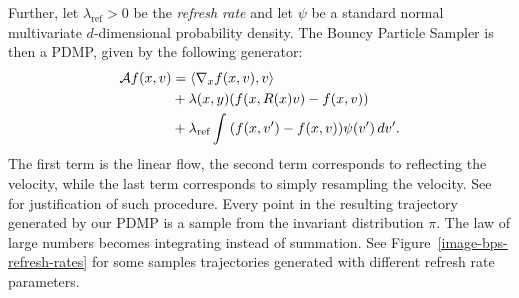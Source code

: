 \documentclass[report.tex]{subfiles}
\begin{document}
Further, let $\lambda_{\text{ref}} > 0$ be the \textit{refresh rate} and let
$\psi$ be a standard normal multivariate $d$-dimensional probability density.
The Bouncy Particle Sampler is then a PDMP, given by the following generator:
\begin{align*}
  \mathcal{A}f(x, v) &= \langle \nabla_{x} f(x, v), v\rangle \\
                     &+ \lambda(x, y)(f(x, R(x)v) - f(x, v)) \\
                     &+ \lambda_{\text{ref}} \int_{{}}^{{}} {(f(x, v') - f(x, v))\psi(v')}\, d{v'}.
\end{align*}
The first term is the linear flow, the second term corresponds to reflecting the velocity,
while the last term corresponds to simply resampling the velocity.
See \cite{peters2012rejection, bouchard2015bouncy} for justification of such procedure.
Every point in the resulting trajectory generated by our PDMP is a sample from
the invariant distribution $\pi$.
The law of large numbers becomes integrating instead of summation.
See Figure~\ref{image-bps-refresh-rates} for some samples trajectories generated
with different refresh rate parameters.
\end{document}
